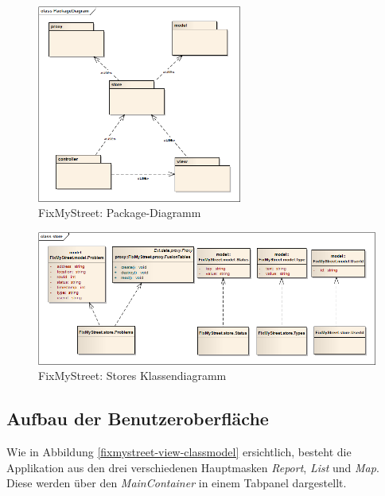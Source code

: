 \begin{figure}[H]
	\centering
	\includegraphics[width=0.6\textwidth]{images/usecase2-fixmystreet/uml/fixmystreet-packagediagram}
	\caption{FixMyStreet: Package-Diagramm}
	\label{fixmystreet-packagediagram}
\end{figure}

\begin{figure}[H]
	\centering
	\includegraphics[width=\textwidth]{images/usecase2-fixmystreet/uml/fixmystreet-store-classmodel}
	\caption{FixMyStreet: Stores Klassendiagramm}
	\label{fixmystreet-store-classmodel}
\end{figure}

\subsection{Aufbau der Benutzeroberfläche}
Wie in Abbildung \ref{fixmystreet-view-classmodel} ersichtlich, besteht die Applikation aus den drei verschiedenen Hauptmasken \emph{Report}, \emph{List} und \emph{Map}. Diese werden über den \emph{MainContainer} in einem Tabpanel dargestellt.

